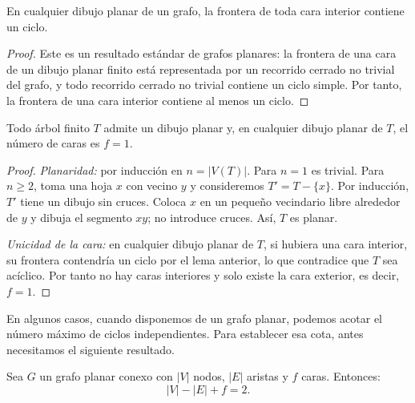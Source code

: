             \begin{lema}
                En cualquier dibujo planar de un grafo, la frontera de toda cara interior contiene un ciclo.
            \end{lema}

            \begin{proof}
                Este es un resultado estándar de grafos planares: la frontera de una cara de un dibujo planar finito está representada por un recorrido cerrado no trivial del grafo, y todo recorrido cerrado no trivial contiene un ciclo simple. Por tanto, la frontera de una cara interior contiene al menos un ciclo.
            \end{proof}

            \begin{proposicion}
                Todo árbol finito $T$ admite un dibujo planar y, en cualquier dibujo planar de $T$, el número de caras es $f=1$.
            \end{proposicion}

            \begin{proof}
                \emph{Planaridad:} por inducción en $n=|V(T)|$.
                Para $n=1$ es trivial.
                Para $n\ge 2$, toma una hoja $x$ con vecino $y$ y consideremos $T'=T-\{x\}$. Por inducción, $T'$ tiene un dibujo sin cruces. Coloca $x$ en un pequeño vecindario libre alrededor de $y$ y dibuja el segmento $xy$; no introduce cruces. Así, $T$ es planar.

                \emph{Unicidad de la cara:} en cualquier dibujo planar de $T$, si hubiera una cara interior, su frontera contendría un ciclo por el lema anterior, lo que contradice que $T$ sea acíclico. Por tanto no hay caras interiores y solo existe la cara exterior, es decir, $f=1$.
            \end{proof}

            En algunos casos, cuando disponemos de un grafo planar, podemos acotar el número máximo de ciclos independientes. Para establecer esa cota, antes necesitamos el siguiente resultado.

            \begin{teorema}
                Sea $G$ un grafo planar conexo con $|V|$ nodos, $|E|$ aristas y $f$ caras. Entonces:
                \[
                    |V|-|E|+f=2.
                \]
            \end{teorema}

